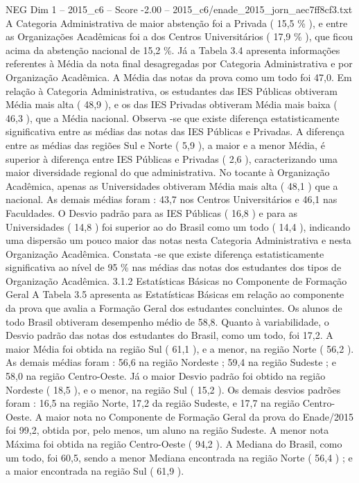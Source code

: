 \begin{textsample}{NEG Dim 1 – 2015\_c6 – Score -2.00 – 2015\_c6/enade\_2015\_jorn\_aec7ff8cf3.txt}
A Categoria Administrativa de maior abstenção foi a Privada ( 15,5 \% ), e entre as Organizações Acadêmicas foi a dos Centros Universitários ( 17,9 \% ), que ficou acima da abstenção nacional de 15,2 \%.
Já a Tabela 3.4 apresenta informações referentes à Média da nota final desagregadas por Categoria Administrativa e por Organização Acadêmica.
A Média das notas da prova como um todo foi 47,0.
Em relação à Categoria Administrativa, os estudantes das IES Públicas obtiveram Média mais alta ( 48,9 ), e os das IES Privadas obtiveram Média mais baixa ( 46,3 ), que a Média nacional.
Observa -se que existe diferença estatisticamente significativa entre as médias das notas das IES Públicas e Privadas.
A diferença entre as médias das regiões Sul e Norte ( 5,9 ), a maior e a menor Média, é superior à diferença entre IES Públicas e Privadas ( 2,6 ), caracterizando uma maior diversidade regional do que administrativa.
No tocante à Organização Acadêmica, apenas as Universidades obtiveram Média mais alta ( 48,1 ) que a nacional.
As demais médias foram : 43,7 nos Centros Universitários e 46,1 nas Faculdades.
O Desvio padrão para as IES Públicas ( 16,8 ) e para as Universidades ( 14,8 ) foi superior ao do Brasil como um todo ( 14,4 ), indicando uma dispersão um pouco maior das notas nesta Categoria Administrativa e nesta Organização Acadêmica.
Constata -se que existe diferença estatisticamente significativa ao nível de 95 \% nas médias das notas dos estudantes dos tipos de Organização Acadêmica. 3.1.2 Estatísticas Básicas no Componente de Formação Geral A Tabela 3.5 apresenta as Estatísticas Básicas em relação ao componente da prova que avalia a Formação Geral dos estudantes concluintes.
Os alunos de todo Brasil obtiveram desempenho médio de 58,8.
Quanto à variabilidade, o Desvio padrão das notas dos estudantes do Brasil, como um todo, foi 17,2.
A maior Média foi obtida na região Sul ( 61,1 ), e a menor, na região Norte ( 56,2 ).
As demais médias foram : 56,6 na região Nordeste ; 59,4 na região Sudeste ; e 58,0 na região Centro-Oeste.
Já o maior Desvio padrão foi obtido na região Nordeste ( 18,5 ), e o menor, na região Sul ( 15,2 ).
Os demais desvios padrões foram : 16,5 na região Norte, 17,2 da região Sudeste, e 17,7 na região Centro-Oeste.
A maior nota no Componente de Formação Geral da prova do Enade/2015 foi 99,2, obtida por, pelo menos, um aluno na região Sudeste.
A menor nota Máxima foi obtida na região Centro-Oeste ( 94,2 ).
A Mediana do Brasil, como um todo, foi 60,5, sendo a menor Mediana encontrada na região Norte ( 56,4 ) ; e a maior encontrada na região Sul ( 61,9 ).

\end{textsample}
